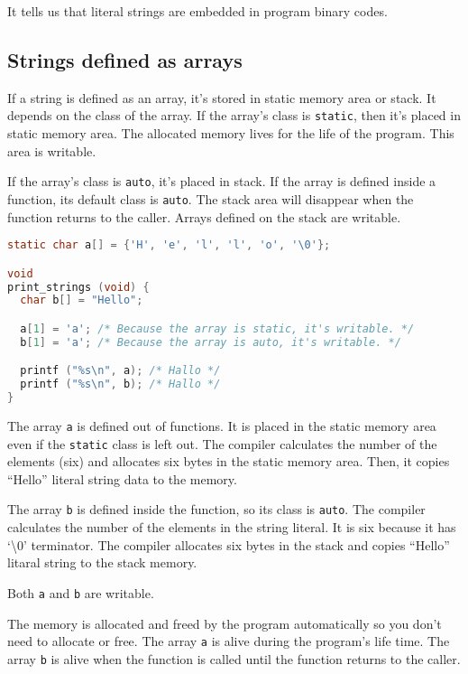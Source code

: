 It tells us that literal strings are embedded in program binary codes.

\subsection{Strings defined as arrays}\label{strings-defined-as-arrays}

If a string is defined as an array, it's stored in static memory area or
stack. It depends on the class of the array. If the array's class is
\passthrough{\lstinline!static!}, then it's placed in static memory
area. The allocated memory lives for the life of the program. This area
is writable.

If the array's class is \passthrough{\lstinline!auto!}, it's placed in
stack. If the array is defined inside a function, its default class is
\passthrough{\lstinline!auto!}. The stack area will disappear when the
function returns to the caller. Arrays defined on the stack are
writable.

\begin{lstlisting}[language=C]
static char a[] = {'H', 'e', 'l', 'l', 'o', '\0'};

void
print_strings (void) {
  char b[] = "Hello";

  a[1] = 'a'; /* Because the array is static, it's writable. */
  b[1] = 'a'; /* Because the array is auto, it's writable. */

  printf ("%s\n", a); /* Hallo */
  printf ("%s\n", b); /* Hallo */
}
\end{lstlisting}

The array \passthrough{\lstinline!a!} is defined out of functions. It is
placed in the static memory area even if the
\passthrough{\lstinline!static!} class is left out. The compiler
calculates the number of the elements (six) and allocates six bytes in
the static memory area. Then, it copies ``Hello'' literal string data to
the memory.

The array \passthrough{\lstinline!b!} is defined inside the function, so
its class is \passthrough{\lstinline!auto!}. The compiler calculates the
number of the elements in the string literal. It is six because it has
`\textbackslash0' terminator. The compiler allocates six bytes in the
stack and copies ``Hello'' litaral string to the stack memory.

Both \passthrough{\lstinline!a!} and \passthrough{\lstinline!b!} are
writable.

The memory is allocated and freed by the program automatically so you
don't need to allocate or free. The array \passthrough{\lstinline!a!} is
alive during the program's life time. The array
\passthrough{\lstinline!b!} is alive when the function is called until
the function returns to the caller.

